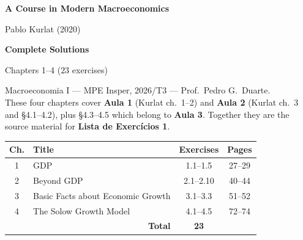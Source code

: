 \documentclass[12pt, letterpaper]{article}
\begin{document}
\begin{titlepage}
\centering
\vspace*{2cm}
{\Huge\bfseries\color{darkblue} A Course in Modern Macroeconomics\par}
\vspace{0.6cm}
{\Large\color{midblue} Pablo Kurlat (2020)\par}
\vspace{1.5cm}
{\LARGE\bfseries Complete Solutions\par}
\vspace{0.3cm}
{\Large Chapters 1--4 \quad ($23$ exercises)\par}
\vspace{2cm}

\begin{tcolorbox}[theorybox,title={Scope and course mapping},width=0.88\textwidth]
\small
Macroeconomia I --- MPE Insper, 2026/T3 --- Prof.\ Pedro G.\ Duarte.\\[4pt]
These four chapters cover \textbf{Aula 1} (Kurlat ch.\ 1--2) and \textbf{Aula 2}
(Kurlat ch.\ 3 and \S4.1--4.2), plus \S4.3--4.5 which belong to \textbf{Aula 3}.
Together they are the source material for \textbf{Lista de Exerc\'icios 1}.
\end{tcolorbox}

\vspace{0.8cm}
\begin{tabular}{clcc}
\toprule
\textbf{Ch.} & \textbf{Title} & \textbf{Exercises} & \textbf{Pages} \\
\midrule
1 & GDP                              & 1.1--1.5   & 27--29 \\
2 & Beyond GDP                       & 2.1--2.10  & 40--44 \\
3 & Basic Facts about Economic Growth & 3.1--3.3   & 51--52 \\
4 & The Solow Growth Model           & 4.1--4.5   & 72--74 \\
\midrule
\multicolumn{2}{r}{\textbf{Total}} & \textbf{23} & \\
\bottomrule
\end{tabular}


\end{titlepage}
\end{document}
